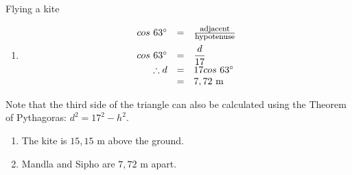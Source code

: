 \begin{wex}{Flying a kite}
{\begin{enumerate}[noitemsep, label=\textbf{\arabic*}. ]
\item
\begin{equation*}
 \begin{array}{ccl}
\hfill cos~ 63^{\circ} &= & \frac{\mbox{\footnotesize adjacent}}{\mbox{\footnotesize hypotenuse}} \hfill \vspace{5pt}\\
\hfill cos~ 63^{\circ} &=& \dfrac{d}{17} \hfill \\
\hfill \therefore d &= & 17 cos~ 63^{\circ} \hfill \\
\hfill  &=& 7,72~\mbox{m} \hfill \\
\end{array}
\end{equation*}
\end{enumerate}
Note that the third side of the triangle can also be calculated using the Theorem of Pythagoras: $d^{2} = 17^{2} - h^{2}$.

\begin{enumerate}[noitemsep, label=\textbf{\arabic*}. ] 
\item The kite is $15,15$ m above the ground.
\item Mandla and Sipho are $7,72$ m apart.
\end{enumerate}
}
\end{wex}

